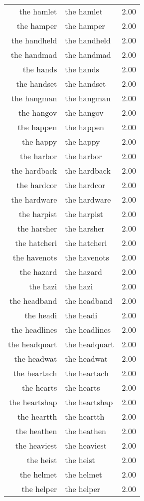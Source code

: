 \begin{table}[ht]
\begin{tabular}{rlr}
  the hamlet & the hamlet & 2.00 \\ 
  the hamper & the hamper & 2.00 \\ 
  the handheld & the handheld & 2.00 \\ 
  the handmad & the handmad & 2.00 \\ 
  the hands & the hands & 2.00 \\ 
  the handset & the handset & 2.00 \\ 
  the hangman & the hangman & 2.00 \\ 
  the hangov & the hangov & 2.00 \\ 
  the happen & the happen & 2.00 \\ 
  the happy & the happy & 2.00 \\ 
  the harbor & the harbor & 2.00 \\ 
  the hardback & the hardback & 2.00 \\ 
  the hardcor & the hardcor & 2.00 \\ 
  the hardware & the hardware & 2.00 \\ 
  the harpist & the harpist & 2.00 \\ 
  the harsher & the harsher & 2.00 \\ 
  the hatcheri & the hatcheri & 2.00 \\ 
  the havenots & the havenots & 2.00 \\ 
  the hazard & the hazard & 2.00 \\ 
  the hazi & the hazi & 2.00 \\ 
  the headband & the headband & 2.00 \\ 
  the headi & the headi & 2.00 \\ 
  the headlines & the headlines & 2.00 \\ 
  the headquart & the headquart & 2.00 \\ 
  the headwat & the headwat & 2.00 \\ 
  the heartach & the heartach & 2.00 \\ 
  the hearts & the hearts & 2.00 \\ 
  the heartshap & the heartshap & 2.00 \\ 
  the heartth & the heartth & 2.00 \\ 
  the heathen & the heathen & 2.00 \\ 
  the heaviest & the heaviest & 2.00 \\ 
  the heist & the heist & 2.00 \\ 
  the helmet & the helmet & 2.00 \\ 
  the helper & the helper & 2.00 \\ 

\end{tabular}
\end{table}
